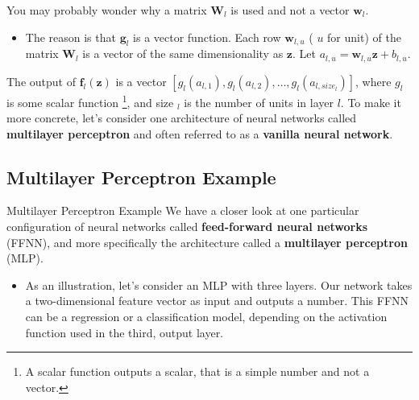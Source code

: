 \documentclass[8pt,dvipsnames]{beamer}
\begin{document}
\begin{frame}
	You may probably wonder why a matrix $\mathbf{W}_{l}$ is used and not a vector $\mathbf{w}_{l}$.
	\begin{itemize}
		\item The reason is that $\boldsymbol{g}_{l}$ is a vector function. Each row $\mathbf{w}_{l, u}$ ( $u$ for unit) of the matrix $\mathbf{W}_{l}$ is a vector of the same dimensionality as $\mathbf{z}$. Let $a_{l, u}=\mathbf{w}_{l, u} \mathbf{z}+b_{l, u}$.
	\end{itemize}
	The output of $\boldsymbol{f}_{l}(\mathbf{z})$ is a vector $\left[g_{l}\left(a_{l, 1}\right), g_{l}\left(a_{l, 2}\right), \ldots, g_{l}\left(a_{l, s i z e_{l}}\right)\right]$, where $g_{l}$ is some scalar function \footnote[frame]{A scalar function outputs a scalar, that is a simple number and not a vector.}, and size $_{l}$ is the number of units in layer $l$. To make it more concrete, let's consider one architecture of neural networks called \textbf{multilayer perceptron} and often referred to as a \textbf{vanilla neural network}.
\end{frame}

\subsection{Multilayer Perceptron Example}
\begin{frame}{Multilayer Perceptron Example}
	We have a closer look at one particular configuration of neural networks called \textbf{feed-forward neural networks} (FFNN), and more specifically the architecture called a \textbf{multilayer perceptron} (MLP).
	\begin{itemize}
		\item 	As an illustration, let's consider an MLP with three layers. Our network takes a two-dimensional feature vector as input and outputs a number. This FFNN can be a regression or a classification model, depending on the activation function used in the third, output layer.
	\end{itemize}
\end{frame}
\end{document}
